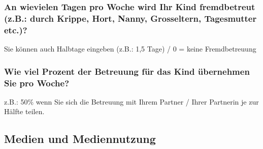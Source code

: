 \subsubsection{An wievielen Tagen pro Woche wird Ihr Kind fremdbetreut (z.B.: durch Krippe, Hort, Nanny, Grosseltern, Tagesmutter etc.)?}
Sie können auch Halbtage eingeben (z.B.: 1,5 Tage) / 0 = keine Fremdbetreuung

\subsubsection{Wie viel Prozent der Betreuung für das Kind übernehmen Sie pro Woche?}
z.B.: 50\% wenn Sie sich die Betreuung mit Ihrem Partner / Ihrer Partnerin je zur Hälfte teilen.

\subsection{Medien und Mediennutzung}